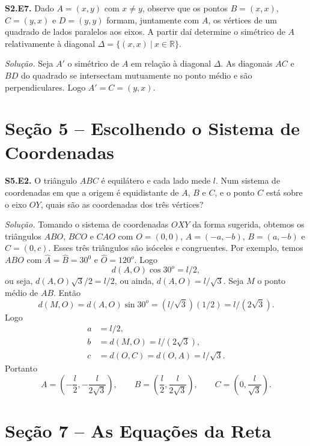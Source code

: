 \documentclass[a4paper,11pt]{article}
\newcommand{\R}{\mathbb{R}}
\begin{document}
\vspace{\baselineskip}

\textbf{S2.E7.}
Dado $A = (x,y)$ com $x \neq y$, observe que os pontos $B = (x,x)$, $C = (y,x)$ e $D = (y,y)$ formam, juntamente com $A$, os vértices de um quadrado de lados paralelos aos eixos.
A partir daí determine o simétrico de $A$ relativamente à diagonal $\Delta = \{(x,x) \ | \ x \in \R \}$.

\vspace{\baselineskip}

\emph{Solução.}
Seja $A'$ o simétrico de $A$ em relação à diagonal $\Delta$.
As diagonais $AC$ e $BD$ do quadrado se intersectam mutuamente no ponto médio e são perpendiculares.
Logo $A' = C = (y,x)$.

\section*{Seção 5 -- Escolhendo o Sistema de Coordenadas}

\textbf{S5.E2.}
O triângulo $ABC$ é equilátero e cada lado mede $l$.
Num sistema de coordenadas em que a origem é equidistante de $A$, $B$ e $C$, e o ponto $C$ está sobre o eixo $OY$, quais são as coordenadas dos três vértices?

\vspace{\baselineskip}

\emph{Solução.}
Tomando o sistema de coordenadas $OXY$ da forma sugerida, obtemos os triângulos $ABO$, $BCO$ e $CAO$ com $O = (0,0)$, $A = (-a,-b)$, $B = (a,-b)$ e $C = (0,c)$.
Esses três triângulos são isóceles e congruentes.
Por exemplo, temos $ABO$ com $\hat{A} = \hat{B} = 30^0$ e $\hat{O} = 120^o$.
Logo
\[
  d(A,O) \cos 30^o = l/2,
\]
ou seja, $d(A,O) \sqrt{3}/2 = l/2$, ou ainda, $d(A,O) = l/\sqrt{3}$.
Seja $M$ o ponto médio de $AB$.
Então
\[
  d(M,O) = d(A,O) \sin 30^o = (l/\sqrt{3})(1/2) = l/(2\sqrt{3}).
\]
Logo
\begin{align*}
  a & = l/2, \\
  b & = d(M,O) = l/(2\sqrt{3}), \\
  c & = d(O,C) = d(O,A) = l/\sqrt{3}.
\end{align*}
Portanto
\[
  A = \left(-\frac{l}{2}, -\frac{l}{2\sqrt{3}} \right), \qquad B = \left( \frac{l}{2}, \frac{l}{2\sqrt{3}} \right), \qquad C = \left(0, \frac{l}{\sqrt{3}} \right).
\]

\section*{Seção 7 -- As Equações da Reta}
\end{document}
